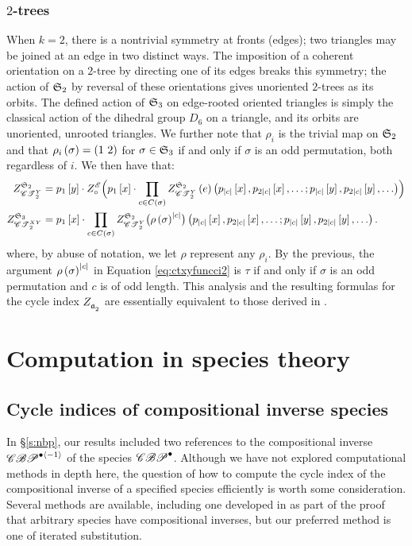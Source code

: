 \documentclass[distribution,draft]{brandiss} %
\numberwithin{section}{chapter}
\numberwithin{figure}{chapter}
\begin{document}
\subsection{$2$-trees}
When $k=2$, there is a nontrivial symmetry at fronts (edges); two triangles may be joined at an edge in two distinct ways.
The imposition of a coherent orientation on a $2$-tree by directing one of its edges breaks this symmetry; the action of $ \mathfrak{S}_{2} $ by reversal of these orientations gives unoriented $2$-trees as its orbits.
The defined action of $ \mathfrak{S}_{3} $ on edge-rooted oriented triangles is simply the classical action of the dihedral group $D_{6}$ on a triangle, and its orbits are unoriented, unrooted triangles.
We further note that $\rho_{i}$ is the trivial map on $ \mathfrak{S}_{2} $ and that $\rho_{i} \pbrac{\sigma} = \pbrac{1\ 2}$ for $\sigma \in  \mathfrak{S}_{3} $ if and only if $\sigma$ is an odd permutation, both regardless of $i$.
We then have that:
\begin{subequations}
  \label{eq:rest2trees}
  \begin{align}
    \gci{\symgp{2}}{\cty{2}} &= p_{1} \sbrac{y} \cdot \gci{\specname{E}} \circ \pbracs[Big]{p_{1} \sbrac{x} \cdot \prod_{c \in C \pbrac{\sigma}} \gcieltvars{\symgp{2}}{\cty{2}}{e}{p_{\abs{c}} \sbrac{x}, p_{2 \abs{c}} \sbrac{x}, \dots; p_{\abs{c}} \sbrac{y}, p_{2 \abs{c}} \sbrac{y}, \dots}} \label{eq:ctyfuncci2} \\
    \gci{\symgp{3}}{\ctxy{2}} &= p_{1} \sbrac{x} \cdot \prod_{c \in C \pbrac{\sigma}} \gci{\symgp{2}}{\cty{2}} \pbracs[big]{\rho \pbrac{\sigma}^{\abs{c}}} \pbrac{p_{\abs{c}} \sbrac{x}, p_{2 \abs{c}} \sbrac{x}, \dots; p_{\abs{c}} \sbrac{y}, p_{2 \abs{c}} \sbrac{y}, \dots}. \label{eq:ctxyfuncci2}
  \end{align}
\end{subequations}
where, by abuse of notation, we let $\rho$ represent any $\rho_{i}$.
By the previous, the argument $\rho \left( {\sigma} \right)^{\left\vert {c} \right\vert}$ in Equation \eqref{eq:ctxyfuncci2} is $\tau$ if and only if $\sigma$ is an odd permutation and $c$ is of odd length.
This analysis and the resulting formulas for the cycle index $ Z_{\mathfrak{a}_{2}^{}}^{} $ are essentially equivalent to those derived in \cite{gessel:spec2trees}.

\appendix
\chapter{Computation in species theory}\label{c:comp}
\section{Cycle indices of compositional inverse species}\label{s:compinv}
In \S \ref{s:nbp}, our results included two references to the compositional inverse $\mathscr{CBP}^{\bullet \left\langle {-1} \right\rangle}$ of the species $\mathscr{CBP}^{\bullet}$.
Although we have not explored computational methods in depth here, the question of how to compute the cycle index of the compositional inverse of a specified species efficiently is worth some consideration.
Several methods are available, including one developed in \cite[4.2.19]{bll:species} as part of the proof that arbitrary species have compositional inverses, but our preferred method is one of iterated substitution.
\end{document}
